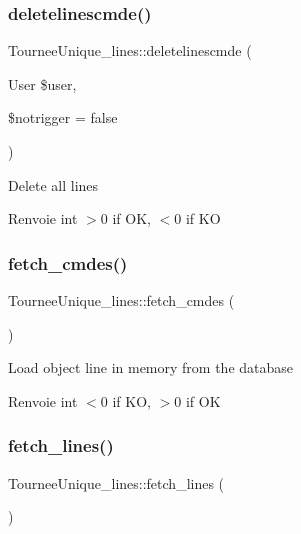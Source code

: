 \subsubsection{\texorpdfstring{deletelinescmde()}{deletelinescmde()}}
{\footnotesize\ttfamily Tournee\+Unique\+\_\+lines\+::deletelinescmde (\begin{DoxyParamCaption}\item[{User}]{\$user,  }\item[{}]{\$notrigger = {\ttfamily false} }\end{DoxyParamCaption})}

Delete all lines

\begin{DoxyReturn}{Renvoie}
int $>$0 if OK, $<$0 if KO 
\end{DoxyReturn}
\mbox{\label{classTourneeUnique__lines_a6891887c52ee8db06808f1e8d25b01f4}} 
\subsubsection{\texorpdfstring{fetch\+\_\+cmdes()}{fetch\_cmdes()}}
{\footnotesize\ttfamily Tournee\+Unique\+\_\+lines\+::fetch\+\_\+cmdes (\begin{DoxyParamCaption}{ }\end{DoxyParamCaption})}

Load object line in memory from the database

\begin{DoxyReturn}{Renvoie}
int $<$0 if KO, $>$0 if OK 
\end{DoxyReturn}
\mbox{\label{classTourneeUnique__lines_a0614c81d6e4ade3d2e1ee9d61cc87cf4}} 
\subsubsection{\texorpdfstring{fetch\+\_\+lines()}{fetch\_lines()}}
{\footnotesize\ttfamily Tournee\+Unique\+\_\+lines\+::fetch\+\_\+lines (\begin{DoxyParamCaption}{ }\end{DoxyParamCaption})}

